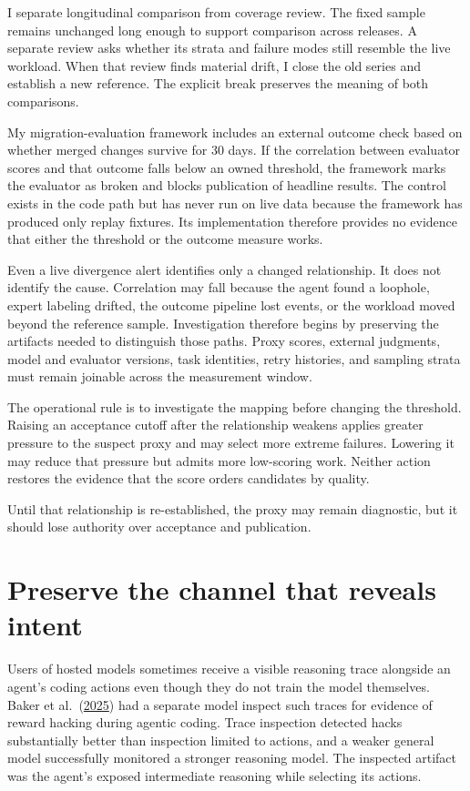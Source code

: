 I separate longitudinal comparison from coverage review. The fixed sample remains unchanged long enough to support comparison across releases. A separate review asks whether its strata and failure modes still resemble the live workload. When that review finds material drift, I close the old series and establish a new reference. The explicit break preserves the meaning of both comparisons.

My migration-evaluation framework includes an external outcome check based on whether merged changes survive for 30 days. If the correlation between evaluator scores and that outcome falls below an owned threshold, the framework marks the evaluator as broken and blocks publication of headline results. The control exists in the code path but has never run on live data because the framework has produced only replay fixtures. Its implementation therefore provides no evidence that either the threshold or the outcome measure works.

Even a live divergence alert identifies only a changed relationship. It does not identify the cause. Correlation may fall because the agent found a loophole, expert labeling drifted, the outcome pipeline lost events, or the workload moved beyond the reference sample. Investigation therefore begins by preserving the artifacts needed to distinguish those paths. Proxy scores, external judgments, model and evaluator versions, task identities, retry histories, and sampling strata must remain joinable across the measurement window.

The operational rule is to investigate the mapping before changing the threshold. Raising an acceptance cutoff after the relationship weakens applies greater pressure to the suspect proxy and may select more extreme failures. Lowering it may reduce that pressure but admits more low-scoring work. Neither action restores the evidence that the score orders candidates by quality.

Until that relationship is re-established, the proxy may remain diagnostic, but it should lose authority over acceptance and publication.

\section{Preserve the channel that reveals intent}\label{preserve-the-channel-that-reveals-intent}

Users of hosted models sometimes receive a visible reasoning trace alongside an agent's coding actions even though they do not train the model themselves. Baker et al.~(\href{https://arxiv.org/abs/2503.11926}{2025}) had a separate model inspect such traces for evidence of reward hacking during agentic coding. Trace inspection detected hacks substantially better than inspection limited to actions, and a weaker general model successfully monitored a stronger reasoning model. The inspected artifact was the agent's exposed intermediate reasoning while selecting its actions.


